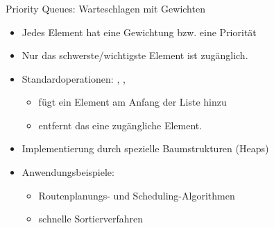 \begin{frame}
\frametitle{\insertsection}
\begin{block}
{Priority Queues: Warteschlagen mit Gewichten}
\begin{itemize}
	\item Jedes Element hat eine Gewichtung bzw. eine Priorität
	\item Nur das schwerste/wichtigste Element ist zugänglich.
	\item<2-> Standardoperationen: , , 
	\begin{itemize}
		\item {} fügt ein Element am Anfang der Liste hinzu
		\item {} entfernt das eine zugängliche Element.
	\end{itemize}
	\item<3-> Implementierung durch spezielle Baumstrukturen (Heaps)
	\item<4-> Anwendungsbeispiele:
	\begin{itemize}
		\item Routenplanungs- und Scheduling-Algorithmen
		\item schnelle Sortierverfahren
	\end{itemize}
\end{itemize}
\end{block}
\end{frame}